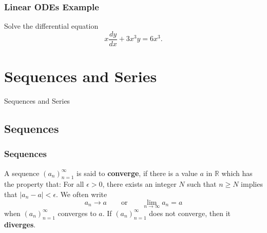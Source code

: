 \documentclass{beamer}
\begin{document}
\begin{frame}[t]
\frametitle{Linear ODEs Example}
\small
\begin{Example}
Solve the differential equation 
$$
x\frac{dy}{dx} + 3x^3y = 6 x^3.
$$
\end{Example}
\end{frame}


\section{Sequences and Series}

\begin{frame}
\begin{center}
\Huge Sequences and Series
\end{center}
\end{frame}

\subsection{Sequences}

\begin{frame}
\frametitle{Sequences}
\begin{Definition}
A sequence $\displaystyle(a_n)_{n = 1}^\infty$ is said to {\bf converge}, if there is a value $a$ in $\mathbb{R}$ which has the property that: For all $\epsilon > 0$, there exists an integer $N$ such that $n\geq N$ implies that $|a_n - a| < \epsilon$.  We often write
$$
a_n\to a\qquad\text{or}\qquad\lim_{n\to\infty} a_n = a
$$
when $\displaystyle(a_n)_{n = 1}^\infty$ converges to $a$. If $\displaystyle(a_n)_{n = 1}^\infty$ does not converge, then it {\bf diverges}. 
\end{Definition}
\end{frame}

\end{document}
